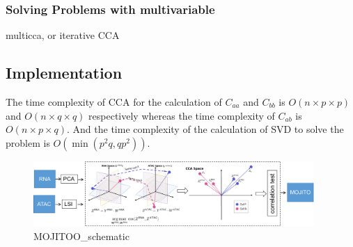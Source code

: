 \subsubsection{Solving Problems with multivariable}

multicca, or iterative CCA

\subsection{Implementation}

The time complexity of CCA for the calculation of $C_{aa}$ and $C_{bb}$ is $O(n\times p \times p)$ and $O(n\times q \times q)$ respectively whereas the time complexity of $C_{ab}$ is $O(n\times p \times q)$. And the time complexity of the  calculation of SVD to solve the problem is $O(\min(p^2q,qp^2))$.
\begin{figure}[!ht]
	\centering
	\includegraphics[width=0.95\textwidth]{MOJITOO_schematic/fig}
	\vspace{0.1cm}
	\caption[MOJITOO\_schematic.]{MOJITOO\_schematic}
	\label{fig:MOJITOO_schematic}
\end{figure}

